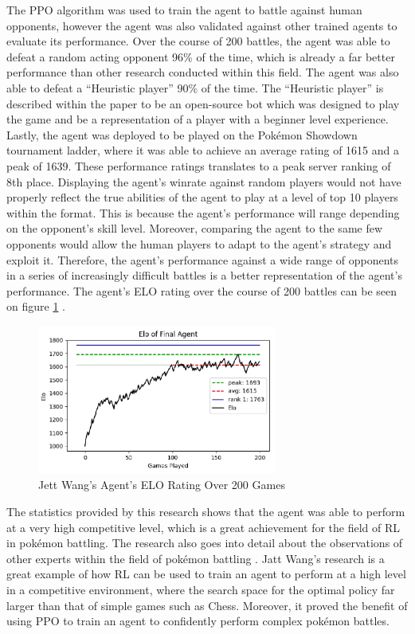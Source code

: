The PPO algorithm was used to train the agent to battle against human opponents, however the agent was also validated against other trained agents to evaluate its performance. Over the course of 200 battles, the agent was able to defeat a random acting opponent 96\% of the time, which is already a far better performance than other research conducted within this field. The agent was also able to defeat a ``Heuristic player'' 90\% of the time. The ``Heuristic player'' is described within the paper to be an open-source bot which was designed to play the game and be a representation of a player with a beginner level experience. Lastly, the agent was deployed to be played on the Pokémon Showdown tournament ladder, where it was able to achieve an average rating of 1615 and a peak of 1639. These performance ratings translates to a peak server ranking of 8th place. Displaying the agent's winrate against random players would not have properly reflect the true abilities of the agent to play at a level of top 10 players within the format. This is because the agent's performance will range depending on the opponent's skill level. Moreover, comparing the agent to the same few opponents would allow the human players to adapt to the agent's strategy and exploit it. Therefore, the agent's performance against a wide range of opponents in a series of increasingly difficult battles is a better representation of the agent's performance. The agent's ELO rating over the course of 200 battles can be seen on figure \ref{fig:agent_elo} \cite{wang2024winning}.

\begin{figure}[H]
    \centering
    \includegraphics[width=0.7\textwidth]{figures/literature_elo.png}
    \caption{Jett Wang's Agent's ELO Rating Over 200 Games}
    \label{fig:agent_elo}
\end{figure}

The statistics provided by this research shows that the agent was able to perform at a very high competitive level, which is a great achievement for the field of RL in pokémon battling. The research also goes into detail about the observations of other experts within the field of pokémon battling \cite{wang2024winning}. Jatt Wang's research is a great example of how RL can be used to train an agent to perform at a high level in a competitive environment, where the search space for the optimal policy far larger than that of simple games such as Chess. Moreover, it proved the benefit of using PPO to train an agent to confidently perform complex pokémon battles. 

